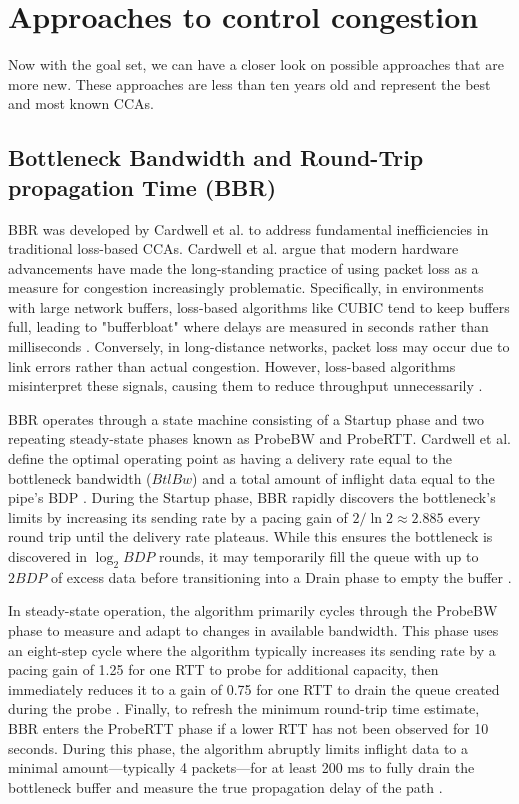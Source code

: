
\section{Approaches to control congestion}\label{sec:Approach}

Now with the goal set, we can have a closer look on possible approaches that are more new.
These approaches are less than ten years old and represent the best and most known \ac{CCA}s.

\subsection{Bottleneck Bandwidth and Round-Trip propagation Time (BBR)}

BBR was developed by Cardwell et al. \cite{BBRORIGINAL} to address fundamental inefficiencies in traditional loss-based \acs{CCA}s. 
Cardwell et al. argue that modern hardware advancements have made the long-standing practice of using packet loss as a measure for congestion increasingly problematic. 
Specifically, in environments with large network buffers, loss-based algorithms like CUBIC tend to keep buffers full, leading to "bufferbloat" where delays are measured in seconds rather than milliseconds . 
Conversely, in long-distance networks, packet loss may occur due to link errors rather than actual congestion.
However, loss-based algorithms misinterpret these signals, causing them to reduce throughput unnecessarily \cite{BBRORIGINAL}.

BBR operates through a state machine consisting of a Startup phase and two repeating steady-state phases known as ProbeBW and ProbeRTT\cite{BBREVALUATION}. 
Cardwell et al. define the optimal operating point as having a delivery rate equal to the bottleneck bandwidth ($BtlBw$) and a total amount of inflight data equal to the pipe's \ac{BDP} \cite{BBRORIGINAL}. 
During the Startup phase, BBR rapidly discovers the bottleneck's limits by increasing its sending rate by a pacing gain of $2/\ln 2 \approx 2.885$ every round trip until the delivery rate plateaus.
While this ensures the bottleneck is discovered in $\log_2 BDP$ rounds, it may temporarily fill the queue with up to $2BDP$ of excess data before transitioning into a Drain phase to empty the buffer \cite{BBRORIGINAL, BBREVALUATION}.

In steady-state operation, the algorithm primarily cycles through the ProbeBW phase to measure and adapt to changes in available bandwidth. 
This phase uses an eight-step cycle where the algorithm typically increases its sending rate by a pacing gain of 1.25 for one \ac{RTT} to probe for additional capacity, then immediately reduces it to a gain of 0.75 for one \ac{RTT} to drain the queue created during the probe \cite{BBREVALUATION}. 
Finally, to refresh the minimum round-trip time estimate, BBR enters the ProbeRTT phase if a lower \ac{RTT} has not been observed for 10 seconds. 
During this phase, the algorithm abruptly limits inflight data to a minimal amount—typically 4 packets—for at least 200 ms to fully drain the bottleneck buffer and measure the true propagation delay of the path \cite{BBRORIGINAL, BBREVALUATION}.

